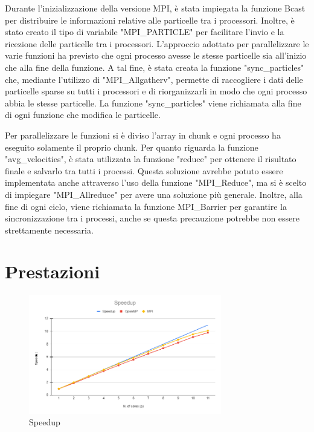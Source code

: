 \documentclass[a4paper,12pt, oneside]{article}
\begin{document}
Durante l'inizializzazione della versione MPI, è stata impiegata la funzione Bcast per
distribuire le informazioni relative alle particelle tra i processori. Inoltre, è stato
creato il tipo di variabile "MPI\_PARTICLE" per facilitare l'invio e la ricezione delle
particelle tra i processori.
L'approccio adottato per parallelizzare le varie funzioni ha previsto che ogni processo
avesse le stesse particelle sia all'inizio che alla fine della funzione. A tal fine, è
stata creata la funzione "sync\_particles" che, mediante l'utilizzo di "MPI\_Allgatherv",
permette di raccogliere i dati delle particelle sparse su tutti i processori e di
riorganizzarli in modo che ogni processo abbia le stesse particelle. La funzione
"sync\_particles" viene richiamata alla fine di ogni funzione che modifica le particelle.

Per parallelizzare le funzioni si è diviso l'array in chunk e ogni processo ha eseguito
solamente il proprio chunk. Per quanto riguarda la funzione "avg\_velocities", è stata
utilizzata la funzione "reduce" per ottenere il risultato finale e salvarlo tra tutti i
processi. Questa soluzione avrebbe potuto essere implementata anche attraverso l'uso
della funzione "MPI\_Reduce", ma si è scelto di impiegare "MPI\_Allreduce" per avere 
una soluzione più generale.
Inoltre, alla fine di ogni ciclo, viene richiamata la funzione MPI\_Barrier per garantire
la sincronizzazione tra i processi, anche se questa precauzione potrebbe non essere
strettamente necessaria.

\section{Prestazioni}

\begin{figure}[h]
    \centering
    \includegraphics[width=0.75\textwidth]{speedup.png}
    \caption{Speedup}
    \label{fig:speedup}
\end{figure}
\end{document}
